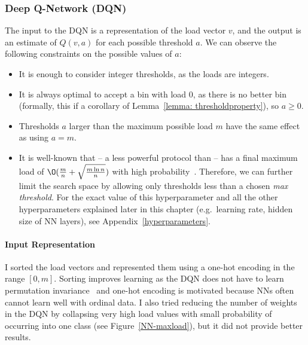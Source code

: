 \subsubsection{Deep Q-Network (DQN)} \label{DQN}

The input to the DQN is a representation of the load vector $v$, and the output is an estimate of $Q(v, a)$ for each possible threshold $a$. We can observe the following constraints on the possible values of $a$:

\begin{itemize}
    \item It is enough to consider integer thresholds, as the loads are integers.
    \item It is always optimal to accept a bin with load $0$, as there is no better bin (formally, this if a corollary of Lemma~\ref{lemma: thresholdproperty}), so $a\geq 0$.
    \item Thresholds $a$ larger than the maximum possible load $m$ have the same effect as using $a=m$.
    \item It is well-known that \OneChoice -- a less powerful protocol than \TwoThinning -- has a final maximum load of $\O (\frac{m}{n} + \sqrt{\frac{m\ln n}{n}})$ with high probability~\cite{raab1998onechoice}. Therefore, we can further limit the search space by allowing only thresholds less than a chosen \textit{max threshold}. For the exact value of this hyperparameter and all the other hyperparameters explained later in this chapter (e.g.\ learning rate, hidden size of NN layers), see Appendix~\ref{hyperparameters}.
    
\end{itemize}


\paragraph{Input Representation} I sorted the load vectors and represented them using a one-hot encoding in the range $[0, m]$. Sorting improves learning as the DQN does not have to learn permutation invariance~\cite{zaheer2017permutationinvariance} and one-hot encoding is motivated because NNs often cannot learn well with ordinal data. I also tried reducing the number of weights in the DQN by collapsing very high load values with small probability of occurring into one class (see Figure~\ref{NN-maxload}), but it did not provide better results.


